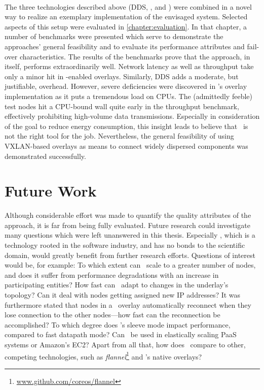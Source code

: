 \paragraph{}
The three technologies described above (DDS, \docker , and \wnet ) were combined in a novel way to realize an exemplary implementation of the envisaged system. Selected aspects of this setup were evaluated in \autoref{chapter:evaluation}. In that chapter, a number of benchmarks were presented which serve to demonstrate the approaches' general feasibility and to evaluate its performance attributes and fail-over characteristics. The results of the benchmarks prove that the approach, in itself, performs extraordinarily well. Network latency as well as throughput take only a minor hit in \weave -enabled overlays. Similarly, DDS adds a moderate, but justifiable, overhead. However, severe deficiencies were discovered in \weave 's overlay implementation as it puts a tremendous load on CPUs. The (admittedly feeble) test nodes hit a CPU-bound wall quite early in the throughput benchmark, effectively prohibiting high-volume data transmissions. Especially in consideration of the goal to reduce energy consumption, this insight leads to believe that \wnet\ is not the right tool for the job. Nevertheless, the general feasibility of using VXLAN-based overlays as means to connect widely dispersed components was demonstrated successfully.


\section{Future Work}
Although considerable effort was made to quantify the quality attributes of the approach, it is far from being fully evaluated. Future research could investigate many questions which were left unanswered in this thesis. Especially \wnet , which is a technology rooted in the software industry, and has no bonds to the scientific domain, would greatly benefit from further research efforts. Questions of interest would be, for example: To which extent can \wnet\ scale to a greater number of nodes, and does it suffer from performance degradations with an increase in participating entities? How fast can \wnet\ adapt to changes in the underlay's topology? Can it deal with nodes getting assigned new IP addresses? It was furthermore stated that nodes in a \wnet\ overlay automatically reconnect when they lose connection to the other nodes---how fast can the reconnection be accomplished? To which degree does \weave 's sleeve mode impact performance, compared to fast datapath mode? Can \weave\ be used in elastically scaling PaaS systems or Amazon's EC2? Apart from all that, how does \weave\ compare to other, competing technologies, such as \emph{flannel}\footnote{\url{www.github.com/coreos/flannel}} and \docker 's native overlays?


